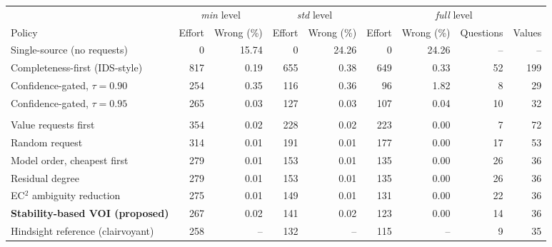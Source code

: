 \begin{tabular}{@{}lrrrrrrrr@{}}
\toprule
 & \multicolumn{2}{c}{\emph{min} level} & \multicolumn{2}{c}{\emph{std} level} & \multicolumn{4}{c}{\emph{full} level} \\
\cmidrule(lr){2-3}\cmidrule(lr){4-5}\cmidrule(l){6-9}
Policy & Effort & Wrong (\%) & Effort & Wrong (\%) & Effort & Wrong (\%) & Questions & Values \\
\midrule
Single-source (no requests) & 0 & 15.74 & 0 & 24.26 & 0 & 24.26 & -- & -- \\
Completeness-first (IDS-style) & 817 & 0.19 & 655 & 0.38 & 649 & 0.33 & 52 & 199 \\
\addlinespace
Confidence-gated, $\tau=0.90$ & 254 & 0.35 & 116 & 0.36 & 96 & 1.82 & 8 & 29 \\
Confidence-gated, $\tau=0.95$ & 265 & 0.03 & 127 & 0.03 & 107 & 0.04 & 10 & 32 \\
\addlinespace
\multicolumn{9}{@{}l}{\emph{Stability-gated policies}} \\
\quad Value requests first & 354 & 0.02 & 228 & 0.02 & 223 & 0.00 & 7 & 72 \\
\quad Random request & 314 & 0.01 & 191 & 0.01 & 177 & 0.00 & 17 & 53 \\
\quad Model order, cheapest first & 279 & 0.01 & 153 & 0.01 & 135 & 0.00 & 26 & 36 \\
\quad Residual degree & 279 & 0.01 & 153 & 0.01 & 135 & 0.00 & 26 & 36 \\
\quad EC$^2$ ambiguity reduction & 275 & 0.01 & 149 & 0.01 & 131 & 0.00 & 22 & 36 \\
\quad \textbf{Stability-based VOI (proposed)} & 267 & 0.02 & 141 & 0.02 & 123 & 0.00 & 14 & 36 \\
\addlinespace
Hindsight reference (clairvoyant) & 258 & -- & 132 & -- & 115 & -- & 9 & 35 \\
\bottomrule
\end{tabular}
